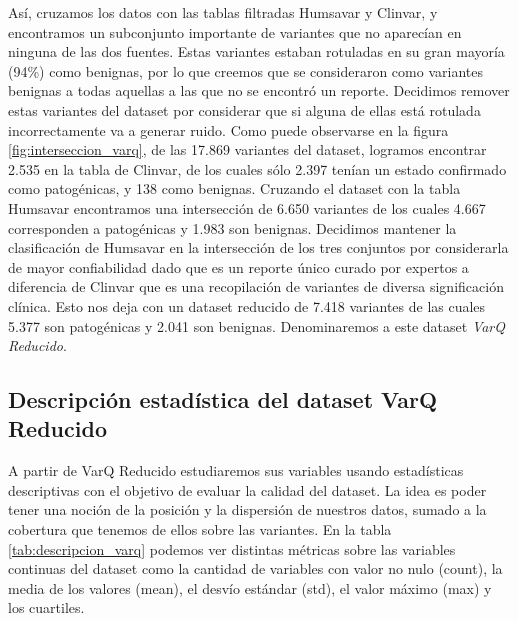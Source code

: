 Así, cruzamos los datos con las tablas filtradas Humsavar y Clinvar, y encontramos un subconjunto importante de variantes que no aparecían en ninguna de las dos fuentes. Estas variantes estaban rotuladas en su gran mayoría (94\%) como benignas, por lo que creemos que se consideraron como variantes benignas a todas aquellas a las que no se encontró un reporte. Decidimos remover estas variantes del dataset por considerar que si alguna de ellas está rotulada incorrectamente va a generar ruido. Como puede observarse en la figura \ref{fig:interseccion_varq}, de las 17.869 variantes del dataset, logramos encontrar 2.535 en la tabla de Clinvar, de los cuales sólo 2.397 tenían un estado confirmado como patogénicas, y 138 como benignas. Cruzando el dataset con la tabla Humsavar encontramos una intersección de 6.650 variantes de los cuales 4.667 corresponden a patogénicas y 1.983 son benignas. Decidimos mantener la clasificación de Humsavar en la intersección de los tres conjuntos por considerarla de mayor confiabilidad dado que es un reporte único curado por expertos a diferencia de Clinvar que es una recopilación de variantes de diversa significación clínica. Esto nos deja con un dataset reducido de 7.418 variantes de las cuales 5.377 son patogénicas y 2.041 son benignas. Denominaremos a este dataset \textit{VarQ Reducido}. 


\subsection{Descripción estadística del dataset VarQ Reducido}

A partir de VarQ Reducido estudiaremos sus variables usando estadísticas descriptivas con el objetivo de evaluar la calidad del dataset. La idea es poder tener una noción de la posición y la dispersión de nuestros datos, sumado a la cobertura que tenemos de ellos sobre las variantes. En la tabla \ref{tab:descripcion_varq} podemos ver distintas métricas sobre las variables continuas del dataset como la cantidad de variables con valor no nulo (count), la media de los valores (mean), el desvío estándar (std), el valor máximo (max) y los cuartiles. 

